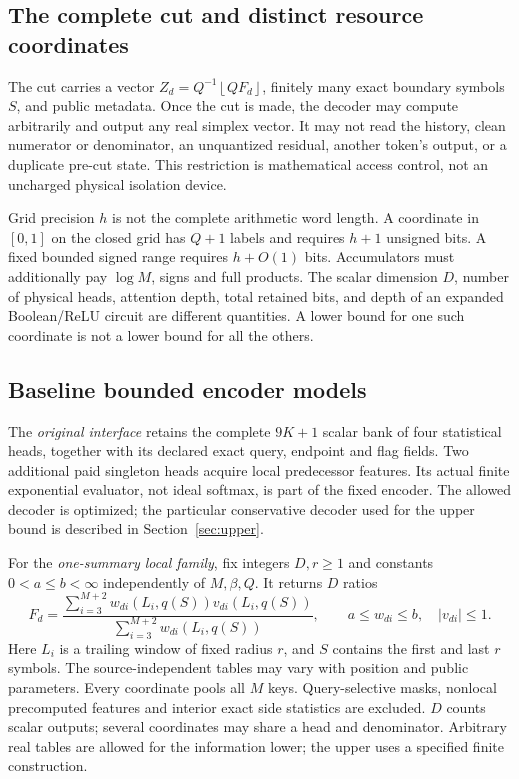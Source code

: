 \documentclass[11pt,letterpaper]{article}
\theoremstyle{definition}\newtheorem{definition}[theorem]{Definition}
\theoremstyle{remark}\newtheorem{remark}[theorem]{Remark}
\newcommand{\floor}[1]{\left\lfloor #1\right\rfloor}
\begin{document}
\subsection{The complete cut and distinct resource coordinates}
The cut carries a vector $Z_d=Q^{-1}\floor{QF_d}$, finitely many exact boundary symbols $S$, and public metadata. Once the cut is made, the decoder may compute arbitrarily and output any real simplex vector. It may not read the history, clean numerator or denominator, an unquantized residual, another token's output, or a duplicate pre-cut state. This restriction is mathematical access control, not an uncharged physical isolation device.

Grid precision $h$ is not the complete arithmetic word length. A coordinate in $[0,1]$ on the closed grid has $Q+1$ labels and requires $h+1$ unsigned bits. A fixed bounded signed range requires $h+O(1)$ bits. Accumulators must additionally pay $\log M$, signs and full products. The scalar dimension $D$, number of physical heads, attention depth, total retained bits, and depth of an expanded Boolean/ReLU circuit are different quantities. A lower bound for one such coordinate is not a lower bound for all the others.

\subsection{Baseline bounded encoder models}
The \emph{original interface} retains the complete $9K+1$ scalar bank of four statistical heads, together with its declared exact query, endpoint and flag fields. Two additional paid singleton heads acquire local predecessor features. Its actual finite exponential evaluator, not ideal softmax, is part of the fixed encoder. The allowed decoder is optimized; the particular conservative decoder used for the upper bound is described in Section~\ref{sec:upper}.

For the \emph{one-summary local family}, fix integers $D,r\ge1$ and constants $0<a\le b<\infty$ independently of $M,\beta,Q$. It returns $D$ ratios
\begin{equation}\label{eq:localratio}
 F_d=\frac{\sum_{i=3}^{M+2} w_{di}(L_i,q(S))v_{di}(L_i,q(S))}
 {\sum_{i=3}^{M+2} w_{di}(L_i,q(S))},\qquad
 a\le w_{di}\le b,\quad |v_{di}|\le1.
\end{equation}
Here $L_i$ is a trailing window of fixed radius $r$, and $S$ contains the first and last $r$ symbols. The source-independent tables may vary with position and public parameters. Every coordinate pools all $M$ keys. Query-selective masks, nonlocal precomputed features and interior exact side statistics are excluded. $D$ counts scalar outputs; several coordinates may share a head and denominator. Arbitrary real tables are allowed for the information lower; the upper uses a specified finite construction.
\end{document}
